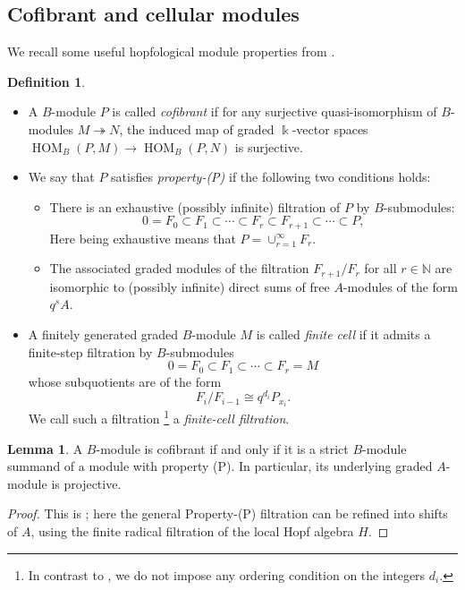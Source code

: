 \documentclass[11pt]{article}
\theoremstyle{definition}
\newtheorem{lem}[thm]{Lemma}
\newtheorem{defn}[thm]{Definition}
\numberwithin{equation}{section}
\newcommand{\HOM}{\operatorname{HOM}}
\begin{document}
\subsection{Cofibrant and cellular modules}
We recall some useful hopfological module properties from \cite{QYHopf}.

\begin{defn}\label{def-cofibrant-p-DG-modules} 
\begin{itemize}
\item[(1)] A $B$-module $P$ is  called \emph{cofibrant} if for any surjective
quasi-isomorphism of $B$-modules $M\twoheadrightarrow N$, the
induced map of graded $\Bbbk$-vector spaces $\HOM_{B}(P,M) \to
\HOM_{B}(P,N)$ is surjective.
\item[(2)]We say that $P$ satisfies \emph{property-(P)} if the
following two conditions holds:
\begin{itemize}
\item[(2.1)] There is an exhaustive (possibly infinite) filtration
of $P$ by $B$-submodules:
$$0= F_{0}\subset F_1\subset \cdots \subset F_r\subset F_{r+1}
\subset \cdots \subset P,$$ Here being exhaustive means that
$P=\cup_{r=1}^{\infty}F_r$.
\item[(2.2)]The associated graded
modules of the filtration $F_{r+1}/F_r$ for all $r\in \mathbb{N}$ are
isomorphic to (possibly infinite) direct sums of free $A$-modules of
the form $q^sA$.
\end{itemize}
\item[(3)] A finitely generated graded $B$-module $M$ is called \emph{finite cell} if it admits a finite-step filtration by $B$-submodules
\[
0=F_0\subset F_1\subset\cdots\subset F_r=M
\]
whose subquotients are of the form
\[
F_i/F_{i-1}\cong q^{d_i}P_{x_i}.
\]
We call such a filtration \footnote{In contrast to \cite{SchPos}, we do not impose any ordering condition on the integers $d_i$.} a \emph{finite-cell filtration}.
\end{itemize}
\end{defn}

\begin{lem}\label{lem:cofibrantcriterion}
A $B$-module is cofibrant if and only if it is a strict
$B$-module summand of a module with property (P).  In particular, its
underlying graded $A$-module is projective.
\end{lem}
\begin{proof}
This is \cite[Corollaries~6.8 and~6.9]{QYHopf}; here the general
Property-(P) filtration can be refined into shifts of $A$, using the
finite radical filtration of the local Hopf algebra $H$.
\end{proof}
\end{document}
